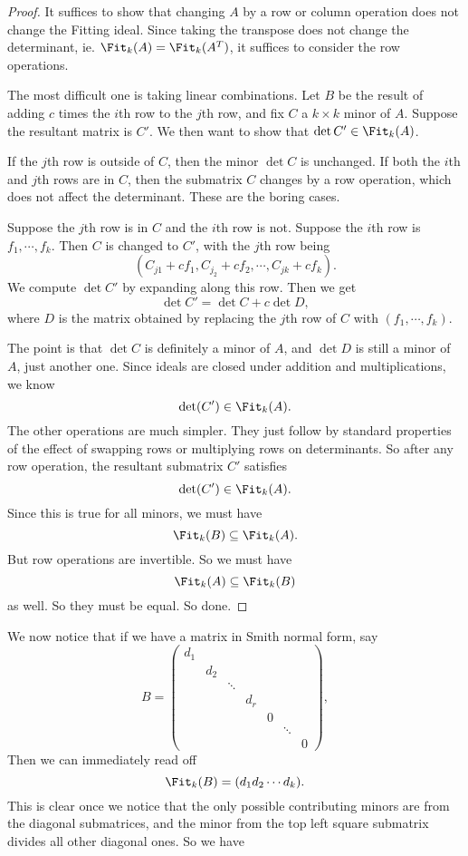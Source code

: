 \documentclass[a4paper]{article}
\begin{document}
\begin{proof}
  It suffices to show that changing $A$ by a row or column operation does not change the Fitting ideal. Since taking the transpose does not change the determinant, ie. $\Fit_k(A) = \Fit_k(A^T)$, it suffices to consider the row operations.

  The most difficult one is taking linear combinations. Let $B$ be the result of adding $c$ times the $i$th row to the $j$th row, and fix $C$ a $k \times k$ minor of $A$. Suppose the resultant matrix is $C'$. We then want to show that $\det C' \in \Fit_k(A)$.

  If the $j$th row is outside of $C$, then the minor $\det C$ is unchanged. If both the $i$th and $j$th rows are in $C$, then the submatrix $C$ changes by a row operation, which does not affect the determinant. These are the boring cases.

  Suppose the $j$th row is in $C$ and the $i$th row is not. Suppose the $i$th row is $f_1, \cdots, f_k$. Then $C$ is changed to $C'$, with the $j$th row being
  \[
    (C_{j1} + c f_1, C_{j_2} + c f_2, \cdots, C_{jk} + c f_k).
  \]
  We compute $\det C'$ by expanding along this row. Then we get
  \[
    \det C'= \det C + c\det D,
  \]
  where $D$ is the matrix obtained by replacing the $j$th row of $C$ with $(f_1, \cdots, f_k)$.

  The point is that $\det C$ is definitely a minor of $A$, and $\det D$ is still a minor of $A$, just another one. Since ideals are closed under addition and multiplications, we know
  \[
    \det (C') \in \Fit_k(A).
  \]
  The other operations are much simpler. They just follow by standard properties of the effect of swapping rows or multiplying rows on determinants. So after any row operation, the resultant submatrix $C'$ satisfies
  \[
    \det (C') \in \Fit_k(A).
  \]
  Since this is true for all minors, we must have
  \[
    \Fit_k(B) \subseteq \Fit_k(A).
  \]
  But row operations are invertible. So we must have
  \[
    \Fit_k(A) \subseteq \Fit_k(B)
  \]
  as well. So they must be equal. So done.
\end{proof}

We now notice that if we have a matrix in Smith normal form, say
\[
  B =
  \begin{pmatrix}
    d_1\\
    & d_2\\
    & & \ddots\\
    & & & d_r\\
    & & & & 0\\
    & & & & & \ddots\\
    & & & & & & 0
  \end{pmatrix},
\]
Then we can immediately read off
\[
  \Fit_k(B) = (d_1 d_2 \cdots d_k).
\]
This is clear once we notice that the only possible contributing minors are from the diagonal submatrices, and the minor from the top left square submatrix divides all other diagonal ones. So we have
\end{document}
